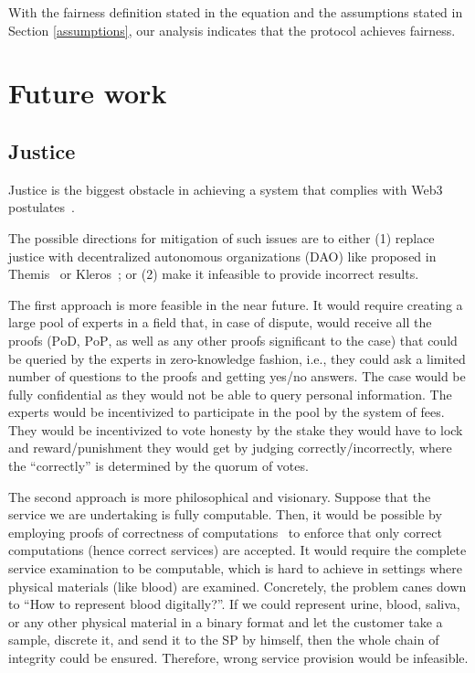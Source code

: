 \documentclass{ieeeaccess}
\begin{document}

With the fairness definition stated in the equation and the assumptions stated in Section \ref{assumptions}, our analysis indicates that the protocol achieves fairness.



\section{Future work}
\label{sec:future-work}

\subsection{Justice}\label{justice}

Justice is the biggest obstacle in achieving a system that complies with Web3 postulates~\cite{Web3Wiki71}.

The possible directions for mitigation of such issues are to either (1) replace justice with decentralized autonomous organizations (DAO) like proposed in Themis~\cite{meng2019themis} or Kleros~\cite{lesaege2018kleros}; or (2) make it infeasible to provide incorrect results.

The first approach is more feasible in the near future. It would require creating a large pool of experts in a field that, in case of dispute, would receive all the proofs ($\mathrm{PoD}$, $\mathrm{PoP}$, as well as any other proofs significant to the case) that could be queried by the experts in zero-knowledge fashion, i.e., they could ask a limited number of questions to the proofs and getting yes/no answers. The case would be fully confidential as they would not be able to query personal information. The experts would be incentivized to participate in the pool by the system of fees. They would be incentivized to vote honesty by the stake they would have to lock and reward/punishment they would get by judging correctly/incorrectly, where the ``correctly'' is determined by the quorum of votes.

The second approach is more philosophical and visionary. Suppose that the service we are undertaking is fully computable. Then, it would be possible by employing proofs of correctness of computations~\cite{ben2013snarks} to enforce that only correct computations (hence correct services) are accepted. It would require the complete service examination to be computable, which is hard to achieve in settings where physical materials (like blood) are examined. Concretely, the problem canes down to ``How to represent blood digitally?''. If we could represent urine, blood, saliva, or any other physical material in a binary format and let the customer take a sample, discrete it, and send it to the SP by himself, then the whole chain of integrity could be ensured. Therefore, wrong service provision would be infeasible.
\end{document}
